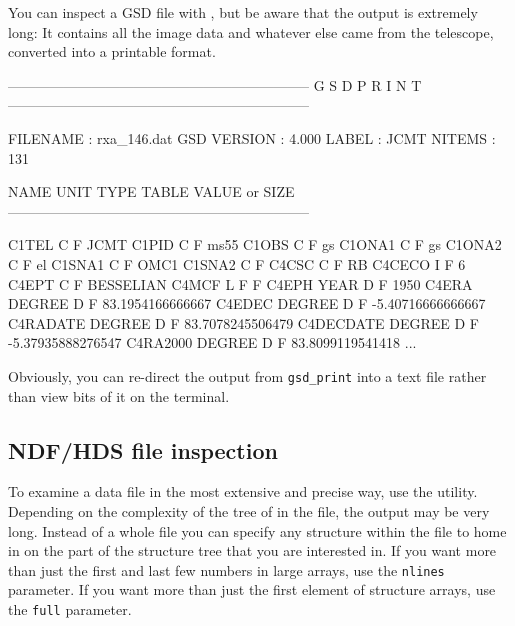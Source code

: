\documentclass[11pt,noabs]{starlink}
\begin{document}
   You can inspect a GSD file with
\texttt{},
   but be aware that the output is extremely long: It contains all the
   image data and whatever else came from the telescope, converted into
   a printable format.

\begin{terminalv}
-----------------------------------------------------------------
 G S D     P R I N T
-----------------------------------------------------------------

 FILENAME     : rxa_146.dat
 GSD VERSION  :  4.000
 LABEL        : JCMT
 NITEMS       : 131


 NAME            UNIT          TYPE      TABLE     VALUE or SIZE
-----------------------------------------------------------------

 C1TEL                         C         F         JCMT
 C1PID                         C         F         ms55
 C1OBS                         C         F         gs
 C1ONA1                        C         F         gs
 C1ONA2                        C         F         el
 C1SNA1                        C         F         OMC1
 C1SNA2                        C         F
 C4CSC                         C         F         RB
 C4CECO                        I         F         6
 C4EPT                         C         F         BESSELIAN
 C4MCF                         L         F         F
 C4EPH           YEAR          D         F         1950
 C4ERA           DEGREE        D         F         83.1954166666667
 C4EDEC          DEGREE        D         F         -5.40716666666667
 C4RADATE        DEGREE        D         F         83.7078245506479
 C4DECDATE       DEGREE        D         F         -5.37935888276547
 C4RA2000        DEGREE        D         F         83.8099119541418
 ...
\end{terminalv}

   Obviously, you can re-direct the output from \texttt{gsd\_print} into a
   text file rather than view bits of it on the terminal.


\subsection{\label{trace2}NDF/HDS file inspection}

   To examine a data file in the most extensive and precise way, use the
\texttt{}
   utility. Depending on the complexity of the tree of
   in the file, the output may be very long. Instead of a whole file you
   can specify any structure within the file to home in on the part of
   the structure tree that you are interested in.
   If you want more than just the first and
   last few numbers in large arrays, use the \texttt{nlines} parameter.
   If you want more than just the first element of structure arrays, use
   the \texttt{full} parameter.
\end{document}
